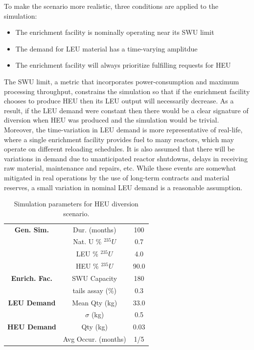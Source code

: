 To make the scenario more realistic, three conditions are applied to the simulation:
\begin{itemize}
\item{The enrichment facility is nominally operating near its \gls{SWU} limit}
\item{The demand for \gls{LEU} material has a time-varying amplitdue}
\item{The enrichment facility will always prioritize fulfilling requests for \gls{HEU}}
\end{itemize}
The \gls{SWU} limit, a metric that incorporates power-consumption and maximum processing throughput, constrains the simulation so that if the enrichment facility chooses to produce \gls{HEU} then its \gls{LEU} output will necessarily decrease.  As a result, if the \gls{LEU} demand were constant then there would be a clear signature of diversion when \gls{HEU} was produced and the simulation would be trivial.  Moreover, the time-variation in \gls{LEU} demand is more representative of real-life, where a single enrichment facility provides fuel to many reactors, which may operate on different reloading schedules. It is also assumed that there will be variations in demand due to unanticipated reactor shutdowns, delays in receiving raw material, maintenance and repairs, etc.  While these events are somewhat mitigated in real operations by the use of long-term contracts and material reserves, a small variation in nominal \gls{LEU} demand is a reasonable assumption.

\begin{table}
\centering
\begin{tabular}{|c|c|c|}
\hline
\textbf{Gen. Sim.} & Dur. (months)      & 100  \\
                    & Nat. U \% $^{235}U$ & 0.7  \\
                    & LEU \% $^{235}U$    & 4.0  \\
                    & HEU \% $^{235}U$    & 90.0 \\
\hline
\textbf{Enrich. Fac.} & SWU Capacity       & 180  \\
                    & tails assay (\%)   & 0.3  \\
\hline
\textbf{LEU Demand} & Mean Qty (kg)       & 33.0  \\
                    & $\sigma$ (kg)       & 0.5  \\
\hline
\textbf{HEU Demand} & Qty (kg)            & 0.03  \\
                    & Avg Occur. (months) & 1/5 \\ 
\hline
\end{tabular}
\caption{Simulation parameters for \gls{HEU} diversion scenario.}
\label{tab:sim_params}
\end{table}

